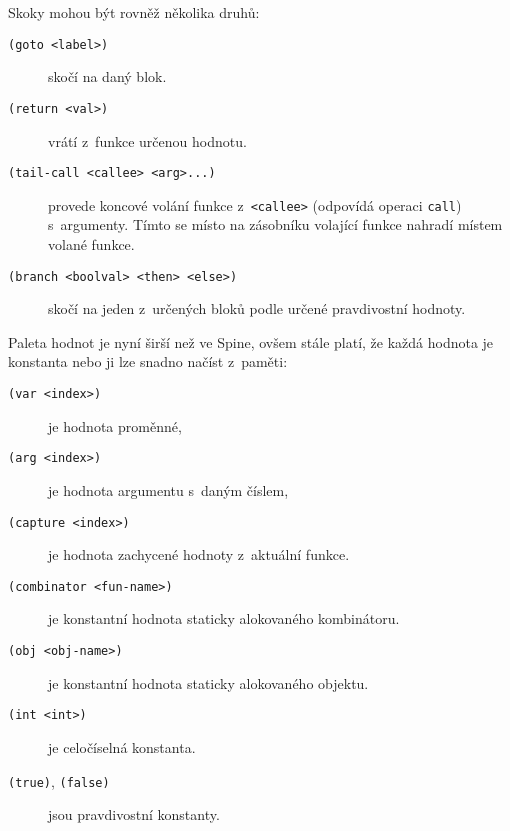Skoky mohou být rovněž několika druhů:

\begin{description}
  \item[\texttt{(goto <label>)}] skočí na daný blok.
  \item[\texttt{(return <val>)}] vrátí z~funkce určenou hodnotu.
  \item[\texttt{(tail-call <callee> <arg>...)}] provede koncové volání funkce
    z~\texttt{<callee>} (odpovídá operaci \texttt{call}) s~argumenty. Tímto se
    místo na zásobníku volající funkce nahradí místem volané funkce.
  \item[\texttt{(branch <boolval> <then> <else>)}] skočí na jeden z~určených
    bloků podle určené pravdivostní hodnoty.
\end{description}

Paleta hodnot je nyní širší než ve Spine, ovšem stále platí, že každá hodnota je
konstanta nebo ji lze snadno načíst z~paměti:

\begin{description}
  \item[\texttt{(var <index>)}] je hodnota proměnné,
  \item[\texttt{(arg <index>)}] je hodnota argumentu s~daným číslem,
  \item[\texttt{(capture <index>)}] je hodnota zachycené hodnoty z~aktuální funkce.
  \item[\texttt{(combinator <fun-name>)}] je konstantní hodnota staticky
    alokovaného kombinátoru.
  \item[\texttt{(obj <obj-name>)}] je konstantní hodnota staticky alokovaného
    objektu.
  \item[\texttt{(int <int>)}] je celočíselná konstanta.
  \item[\texttt{(true)}, \texttt{(false)}] jsou pravdivostní konstanty.
\end{description}
